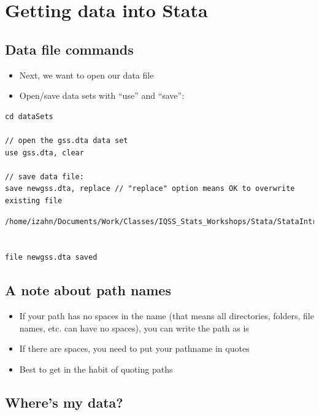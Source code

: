 \documentclass[]{book}
\providecommand{\tightlist}{%
  \setlength{\itemsep}{0pt}\setlength{\parskip}{0pt}}
\begin{document}
\section{Getting data into Stata}\label{getting-data-into-stata}

\subsection{Data file commands}\label{data-file-commands}

\begin{itemize}
\tightlist
\item
  Next, we want to open our data file
\item
  Open/save data sets with ``use'' and ``save'':
\end{itemize}

\begin{verbatim}
cd dataSets

// open the gss.dta data set
use gss.dta, clear

// save data file:
save newgss.dta, replace // "replace" option means OK to overwrite existing file
\end{verbatim}

\begin{verbatim}
/home/izahn/Documents/Work/Classes/IQSS_Stats_Workshops/Stata/StataIntro/dataSets


file newgss.dta saved
\end{verbatim}

\subsection{A note about path names}\label{a-note-about-path-names}

\begin{itemize}
\tightlist
\item
  If your path has no spaces in the name (that means all directories,
  folders, file names, etc. can have no spaces), you can write the path
  as is
\item
  If there are spaces, you need to put your pathname in quotes
\item
  Best to get in the habit of quoting paths
\end{itemize}

\subsection{Where's my data?}\label{wheres-my-data}
\end{document}
